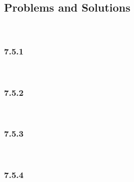 \subsection{Problems and Solutions}\hfill\\\par
\subsubsection{7.5.1}\hfill\\
\par\bigskip
\subsubsection{7.5.2}\hfill\\
\par\bigskip
\subsubsection{7.5.3}\hfill\\
\par\bigskip
\subsubsection{7.5.4}\hfill\\
